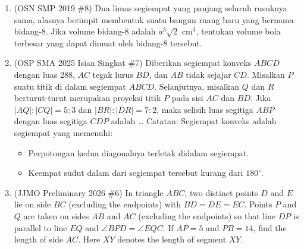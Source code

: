 \documentclass[11pt,letterpaper]{article}
\begin{document}
\begin{enumerate}[resume]
    \item (OSN SMP 2019 \#8) Dua limas segiempat yang panjang seluruh rusuknya sama, alasnya berimpit membentuk suatu bangun ruang baru yang bernama bidang-8. Jika volume bidang-8 adalah $a^{3}\sqrt{2}$ cm$^{3}$, tentukan volume bola terbesar yang dapat dimuat oleh bidang-8 tersebut.

    \item (OSP SMA 2025 Isian Singkat \#7) Diberikan segiempat konveks $ABCD$ dengan luas 288, $AC$ tegak lurus $BD$, dan $AB$ tidak sejajar $CD$. Misalkan $P$ suatu titik di dalam segiempat $ABCD$. Selanjutnya, misalkan $Q$ dan $R$ berturut-turut merupakan proyeksi titik $P$ pada sisi $AC$ dan $BD$. Jika $|AQ| : |CQ| = 5 : 3$ dan $|BR| : |DR| = 7 : 2$, maka selisih luas segitiga $ABP$ dengan luas segitiga $CDP$ adalah \dots
    Catatan: Segiempat konveks adalah segiempat yang memenuhi:
    \begin{itemize}
        \item Perpotongan kedua diagonalnya terletak didalam segiempat.
        \item Keempat sudut dalam dari segiempat tersebut kurang dari $180^\circ$.
    \end{itemize}

    \item (JJMO Preliminary 2026 \#6) In triangle $ABC$, two distinct points $D$ and $E$ lie on side $BC$ (excluding the endpoints) with $BD=DE=EC$. Points $P$ and $Q$ are taken on sides $AB$ and $AC$ (excluding the endpoints) so that line $DP$ is parallel to line $EQ$ and $\angle BPD=\angle EQC$. If $AP=5$ and $PB=14$, find the length of side $AC$. Here $XY$ denotes the length of segment $XY$.


\end{enumerate}
\end{document}

